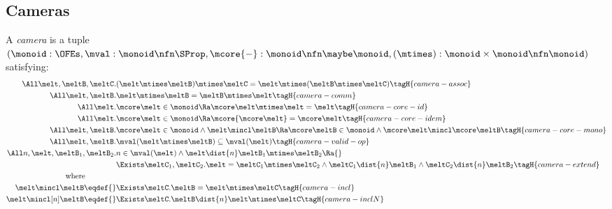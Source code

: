 \subsection{Cameras}

\begin{defn}
  A \emph{camera} is a tuple $(\monoid : \OFEs, \mval : \monoid \nfn \SProp, \mcore{{-}}: \monoid \nfn \maybe\monoid,\\ (\mtimes) : \monoid \times \monoid \nfn \monoid)$ satisfying:
  \begin{align*}
    \All \melt, \meltB, \meltC.& (\melt \mtimes \meltB) \mtimes \meltC = \melt \mtimes (\meltB \mtimes \meltC) \tagH{camera-assoc} \\
    \All \melt, \meltB.& \melt \mtimes \meltB = \meltB \mtimes \melt \tagH{camera-comm} \\
    \All \melt.& \mcore\melt \in \monoid \Ra \mcore\melt \mtimes \melt = \melt \tagH{camera-core-id} \\
    \All \melt.& \mcore\melt \in \monoid \Ra \mcore{\mcore\melt} = \mcore\melt \tagH{camera-core-idem} \\
    \All \melt, \meltB.& \mcore\melt \in \monoid \land \melt \mincl \meltB \Ra \mcore\meltB \in \monoid \land \mcore\melt \mincl \mcore\meltB \tagH{camera-core-mono} \\
    \All \melt, \meltB.& \mval(\melt \mtimes \meltB) \subseteq \mval(\melt)  \tagH{camera-valid-op} \\
    \All n, \melt, \meltB_1, \meltB_2.& \omit\rlap{$n \in \mval(\melt) \land \melt \dist{n} \meltB_1 \mtimes \meltB_2 \Ra {}$} \\
    &\Exists \meltC_1, \meltC_2. \melt = \meltC_1 \mtimes \meltC_2 \land \meltC_1 \dist{n} \meltB_1 \land \meltC_2 \dist{n} \meltB_2 \tagH{camera-extend} \\
    \text{where}\qquad\qquad\\
    \melt \mincl \meltB \eqdef{}& \Exists \meltC. \meltB = \melt \mtimes \meltC \tagH{camera-incl} \\
    \melt \mincl[n] \meltB \eqdef{}& \Exists \meltC. \meltB \dist{n} \melt \mtimes \meltC \tagH{camera-inclN}
  \end{align*}
\end{defn}

